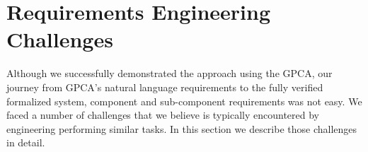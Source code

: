 \section{Requirements Engineering Challenges}
\label{sec:challenge}

Although we successfully demonstrated the approach using the GPCA, our journey from GPCA's natural language requirements to the fully verified formalized system, component and sub-component requirements was not easy. We faced a number of challenges that we believe is typically encountered by engineering performing similar tasks. In this section we describe those challenges in detail.

